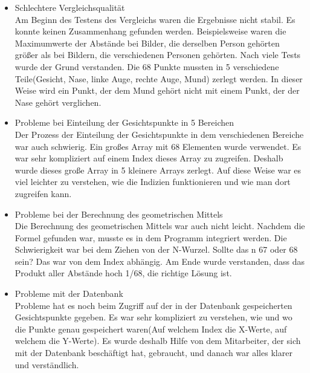 \begin{itemize}
		Am Beginn war das Umgehen mit dem Aufruf der Skripten sehr schwer. Es war schwer zu verstehen wie das genau funktioniert, weil die große Variablenanzahl die Arbeit kompliziert machte. Dieser Anzahl wurde reduziert und es wurden viele Recherchen über die korrekten Verwendung des \textit{sys} Paketes gemacht um das Problem zu l{\"o}sen.
		
		\item Schlechtere Vergleichsqualität \\
		
		Am Beginn des Testens des Vergleichs waren die Ergebnisse nicht stabil. Es konnte keinen Zusammenhang gefunden werden. Beispielsweise waren die Maximumwerte der Abstände bei Bilder, die derselben Person gehörten größer als bei Bildern, die verschiedenen Personen gehörten. Nach viele Tests wurde der Grund verstanden. Die 68 Punkte mussten in 5 verschiedene Teile(Gesicht, Nase, linke Auge, rechte Auge, Mund) zerlegt werden. In dieser Weise wird ein Punkt, der dem Mund gehört nicht mit einem Punkt, der der Nase gehört verglichen.
		
		\item Probleme bei Einteilung der Gesichtspunkte in 5 Bereichen \\
		
		Der Prozess der Einteilung der Gesichtspunkte in dem verschiedenen Bereiche war auch schwierig. Ein großes Array mit 68 Elementen wurde verwendet. Es war sehr kompliziert auf einem Index dieses Array zu zugreifen. Deshalb wurde dieses große Array in 5 kleinere Arrays zerlegt. Auf diese Weise war es viel leichter zu verstehen, wie die Indizien funktionieren und wie man dort zugreifen kann.
		
		\item Probleme bei der Berechnung des geometrischen Mittels \\
		
		Die Berechnung des geometrischen Mittels war auch nicht leicht. Nachdem die Formel gefunden war, musste es in dem Programm integriert werden. Die Schwierigkeit war bei dem Ziehen von der N-Wurzel. Sollte das n 67 oder 68 sein? Das war von dem Index abhängig. Am Ende wurde verstanden, dass das Produkt aller Abstände hoch 1/68, die richtige Lösung ist.
		
		\item Probleme mit der Datenbank \\
		
		Probleme hat es noch beim Zugriff auf der in der Datenbank gespeicherten Gesichtspunkte gegeben. Es war sehr kompliziert zu verstehen, wie und wo  die Punkte genau gespeichert waren(Auf welchem Index die X-Werte, auf welchem die Y-Werte). Es wurde deshalb Hilfe von dem Mitarbeiter, der sich mit der Datenbank beschäftigt hat, gebraucht, und danach war alles klarer und verständlich.
		

\end{itemize}
